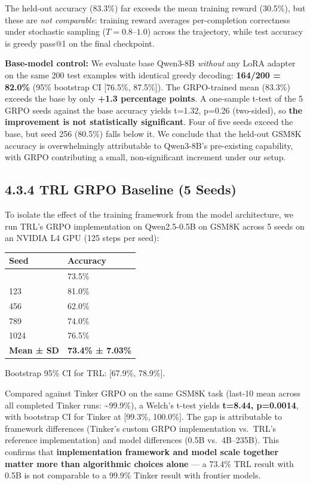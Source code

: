 \documentclass[
  american,
  11pt,
  a4paper,
  oneside]{report}
\newcounter{none} %
\begin{document}
The held-out accuracy (83.3\%) far exceeds the mean training reward
(30.5\%), but these are \emph{not comparable}: training reward averages
per-completion correctness under stochastic sampling
(\(T{=}0.8\)--\(1.0\)) across the trajectory, while test accuracy is
greedy pass@1 on the final checkpoint.

\textbf{Base-model control:} We evaluate base Qwen3-8B \emph{without}
any LoRA adapter on the same 200 test examples with identical greedy
decoding: \textbf{164/200 = 82.0\%} (95\% bootstrap CI {[}76.5\%,
87.5\%{]}). The GRPO-trained mean (83.3\%) exceeds the base by only
\textbf{+1.3 percentage points}. A one-sample t-test of the 5 GRPO seeds
against the base accuracy yields t=1.32, p=0.26 (two-sided), so
\textbf{the improvement is not statistically significant}. Four of five
seeds exceed the base, but seed 256 (80.5\%) falls below it. We conclude
that the held-out GSM8K accuracy is overwhelmingly attributable to
Qwen3-8B's pre-existing capability, with GRPO contributing a small,
non-significant increment under our setup.

\subsection{4.3.4 TRL GRPO Baseline (5
Seeds)}\label{trl-grpo-baseline-5-seeds}

To isolate the effect of the training framework from the model
architecture, we run TRL's GRPO implementation on Qwen2.5-0.5B on GSM8K
across 5 seeds on an NVIDIA L4 GPU (125 steps per seed):

{\def\LTcaptype{none} %
\begin{longtable}[]{@{}ll@{}}
\toprule\noalign{}
Seed & Accuracy \\
\midrule\noalign{}
\endhead
\bottomrule\noalign{}
\endlastfoot
42 & 73.5\% \\
123 & 81.0\% \\
456 & 62.0\% \\
789 & 74.0\% \\
1024 & 76.5\% \\
\textbf{Mean ± SD} & \textbf{73.4\% ± 7.03\%} \\
\end{longtable}
}

Bootstrap 95\% CI for TRL: {[}67.9\%, 78.9\%{]}.

Compared against Tinker GRPO on the same GSM8K task (last-10 mean across
all completed Tinker runs: \textasciitilde99.9\%), a Welch's t-test
yields \textbf{t=8.44, p=0.0014}, with bootstrap CI for Tinker at
{[}99.3\%, 100.0\%{]}. The gap is attributable to framework differences
(Tinker's custom GRPO implementation vs.~TRL's reference implementation)
and model differences (0.5B vs.~4B--235B). This confirms that
\textbf{implementation framework and model scale together matter more
than algorithmic choices alone} --- a 73.4\% TRL result with 0.5B is not
comparable to a 99.9\% Tinker result with frontier models.
\end{document}
